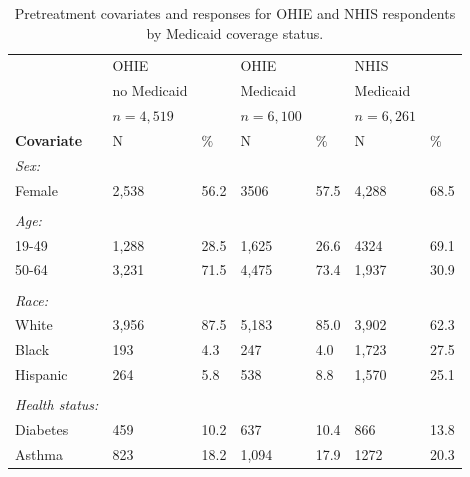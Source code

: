 \documentclass[hidelinks,12pt]{article}
\begin{document}
\begin{appendices}
\begin{singlespace}
	\begin{longtable}{lllllll}
		\caption{Pretreatment covariates and responses for OHIE and NHIS respondents by Medicaid coverage status.\label{rct-nrt-compare}} \\
		& OHIE &  & OHIE &  & NHIS &  \\ 
		& no Medicaid &  & Medicaid &  &Medicaid &   \\ 
		& $n=4,519$ &  & $n=6,100$ &  & $n=6,261$ &  \\  
		\hline   
		\hline   
		\textbf{Covariate} &  N & $\mathbf{\%}$ & N & $\mathbf{\%}$ & N & $\mathbf{\%}$ \\ 
		\hline
		\textit{Sex:} &  & & &  &  & \\ 
		
		\hspace{3mm} Female & 2,538 & 56.2 & 3506 & 57.5 & 4,288 & 68.5 \\ 
		&  & & &  &  & \\ 
		\textit{Age:} &  & & &  &  & \\ 
		\hspace{3mm}19-49 & 1,288 & 28.5 & 1,625 & 26.6 & 4324 & 69.1  \\ 
		
		\hspace{3mm}50-64 & 3,231 & 71.5 & 4,475 & 73.4 & 1,937 & 30.9 \\ 
		&  & & &  &  & \\ 
		\textit{Race:} &  & & &  &  & \\ 
		\hspace{3mm}White & 3,956 & 87.5 & 5,183 & 85.0 & 3,902 & 62.3  \\ 
		
		\hspace{3mm}Black & 193 & 4.3 & 247 & 4.0 & 1,723 & 27.5  \\ 
		
		\hspace{3mm}Hispanic &  264 & 5.8 & 538 & 8.8 & 1,570 & 25.1  \\ 
		&  & & &  &  & \\ 
		\textit{Health status:} &  & & &  &  & \\ 
		\hspace{3mm}Diabetes & 459 & 10.2 & 637 & 10.4 & 866 & 13.8  \\ 
		
		\hspace{3mm}Asthma & 823 & 18.2 & 1,094 & 17.9 & 1272 & 20.3   \\ 
		

\end{longtable}
\end{singlespace}
\end{appendices}
\end{document}
